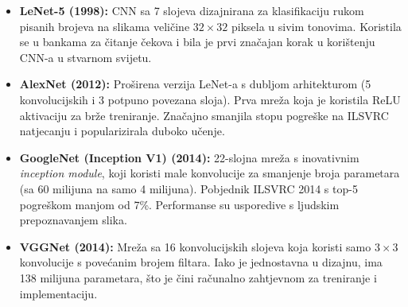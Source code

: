 \begin{itemize}
    \item \textbf{LeNet-5 (1998):} 
    CNN sa 7 slojeva dizajnirana za klasifikaciju rukom pisanih brojeva na slikama 
    veličine \(32 \times 32\) piksela u sivim tonovima. Koristila se u bankama za čitanje čekova 
    i bila je prvi značajan korak u korištenju CNN-a u stvarnom svijetu.

    \item \textbf{AlexNet (2012):} 
    Proširena verzija LeNet-a s dubljom arhitekturom (5 konvolucijskih i 3 potpuno povezana 
    sloja). Prva mreža koja je koristila ReLU aktivaciju za brže treniranje. Značajno smanjila
    stopu pogreške na ILSVRC natjecanju i popularizirala duboko učenje.

    \item \textbf{GoogleNet (Inception V1) (2014):} 
    22-slojna mreža s inovativnim \emph{inception module}, koji koristi male konvolucije za 
    smanjenje broja parametara (sa 60 milijuna na samo 4 milijuna). Pobjednik ILSVRC 2014 s 
    top-5 pogreškom manjom od 7\%. Performanse su usporedive s ljudskim prepoznavanjem slika.

    \item \textbf{VGGNet (2014):} 
    Mreža sa 16 konvolucijskih slojeva koja koristi samo \(3 \times 3\) konvolucije s povećanim
    brojem filtara. Iako je jednostavna u dizajnu, ima 138 milijuna parametara, što je čini 
    računalno zahtjevnom za treniranje i implementaciju.
\end{itemize}